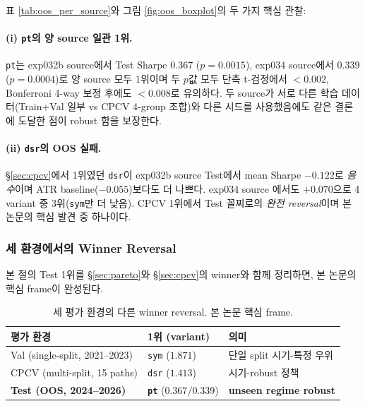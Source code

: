 \documentclass[11pt, a4paper]{article}
\begin{document}
표 \ref{tab:oos_per_source}와 그림 \ref{fig:oos_boxplot}의 두 가지 핵심 관찰:

\paragraph{(i) \texttt{pt}의 양 source 일관 1위.}
\texttt{pt}는 exp032b source에서 Test Sharpe $0.367$ ($p = 0.0015$),
exp034 source에서 $0.339$ ($p = 0.0004$)로 양 source 모두 1위이며 두 $p$값
모두 단측 t-검정에서 $< 0.002$, Bonferroni 4-way 보정 후에도 $< 0.008$로
유의하다. 두 source가 서로 다른 학습 데이터(Train+Val 일부 vs CPCV 4-group
조합)와 다른 시드를 사용했음에도 같은 결론에 도달한 점이 robust 함을 보장한다.

\paragraph{(ii) \texttt{dsr}의 OOS 실패.}
\S\ref{sec:cpcv}에서 1위였던 \texttt{dsr}이 exp032b source Test에서 mean Sharpe
$-0.122$로 \emph{음수}이며 ATR baseline($-0.055$)보다도 더 나쁘다. exp034 source
에서도 $+0.070$으로 4 variant 중 3위(\texttt{sym}만 더 낮음). CPCV 1위에서 Test
꼴찌로의 \emph{완전 reversal}이며 본 논문의 핵심 발견 중 하나이다.

\subsubsection{세 환경에서의 Winner Reversal}
\label{sec:oos_three_env_reversal}

본 절의 Test 1위를 \S\ref{sec:pareto}와 \S\ref{sec:cpcv}의 winner와 함께
정리하면, 본 논문의 핵심 frame이 완성된다.

\begin{table}[!htbp]
\centering
\caption{세 평가 환경의 다른 winner reversal. 본 논문 핵심 frame.}
\begin{tabular}{lll}
\toprule
평가 환경 & 1위 (variant) & 의미 \\
\midrule
Val (single-split, 2021--2023) & \texttt{sym} ($1.871$) & 단일 split 시기-특정 우위 \\
CPCV (multi-split, 15 paths) & \texttt{dsr} ($1.413$) & 시기-robust 정책 \\
\textbf{Test (OOS, 2024--2026)} & \textbf{\texttt{pt}} ($0.367 / 0.339$) & \textbf{unseen regime robust} \\
\bottomrule
\end{tabular}
\label{tab:three_env_reversal}
\end{table}
\end{document}
